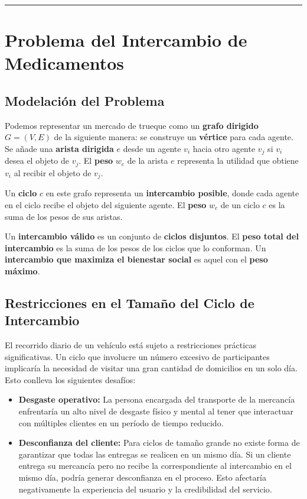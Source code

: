 \documentclass[twocolumn, fontsize=10pt]{article}
\theoremstyle{definition} %
\begin{document}
\rule{\linewidth}{0.5pt}


\section{Problema del Intercambio de Medicamentos}

\subsection{Modelación del Problema}

Podemos representar un mercado de trueque como un \textbf{grafo dirigido} \( G = (V, E) \) de la siguiente manera: se construye un \textbf{vértice} para cada agente. Se añade una \textbf{arista dirigida} \( e \) desde un agente \( v_i \) hacia otro agente \( v_j \) si \( v_i \) desea el objeto de \( v_j \). El \textbf{peso} \( w_e \) de la arista \( e \) representa la utilidad que obtiene \( v_i \) al recibir el objeto de \( v_j \).  

Un \textbf{ciclo} \( c \) en este grafo representa un \textbf{intercambio posible}, donde cada agente en el ciclo recibe el objeto del siguiente agente. El \textbf{peso} \( w_c \) de un ciclo \( c \) es la suma de los pesos de sus aristas.  

Un \textbf{intercambio válido} es un conjunto de \textbf{ciclos disjuntos}. El \textbf{peso total del intercambio} es la suma de los pesos de los ciclos que lo conforman. Un \textbf{intercambio que maximiza el bienestar social} es aquel con el \textbf{peso máximo}. 

\subsection{Restricciones en el Tamaño del Ciclo de Intercambio}

El recorrido diario de un vehículo está sujeto a restricciones prácticas significativas. Un ciclo que involucre un número excesivo de participantes implicaría la necesidad de visitar una gran cantidad de domicilios en un solo día. Esto conlleva los siguientes desafíos:
\begin{itemize}
\item\textbf{Desgaste operativo:}
La persona encargada del transporte de la mercancía enfrentaría un alto nivel de desgaste físico y mental al tener que interactuar con múltiples clientes en un período de tiempo reducido.
\item\textbf{Desconfianza del cliente:}
Para ciclos de tamaño grande no existe forma de garantizar que todas las entregas se realicen en un mismo día. Si un cliente entrega su mercancía pero no recibe la correspondiente al intercambio en el mismo día, podría generar desconfianza en el proceso. Esto afectaría negativamente la experiencia del usuario y la credibilidad del servicio.
\end{itemize}
\end{document}
